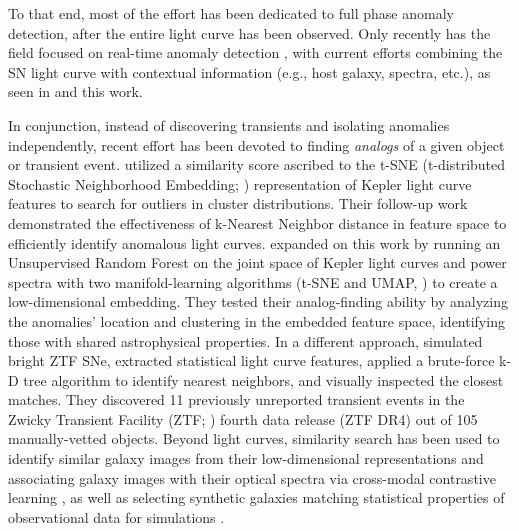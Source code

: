 \documentclass[twocolumn]{aastex63}
\begin{document}
To that end, most of the effort has been dedicated to full phase anomaly detection, after the entire light curve has been observed. Only recently has the field focused on real-time anomaly detection \citep{Soraisam2020, Villar2021, Muthukrishna2022, Perez-Carrasco2023, Gupta2024}, with current efforts combining the SN light curve with contextual information (e.g., host galaxy, spectra, etc.), as seen in \cite{Perez-Carrasco2023} and this work. \par

In conjunction, instead of discovering transients and isolating anomalies independently, recent effort has been devoted to finding \emph{analogs} of a given object or transient event. \cite{Giles2019} utilized a similarity score ascribed to the t-SNE (t-distributed Stochastic Neighborhood Embedding; \citealt{vanderMaaten2008}) representation of Kepler light curve features to search for outliers in cluster distributions. Their follow-up work \citep{Giles2020} demonstrated the effectiveness of k-Nearest Neighbor distance in feature space to efficiently identify anomalous light curves. \cite{Galarza2021} expanded on this work by running an Unsupervised Random Forest \citep{Shi2006} on the joint space of Kepler light curves and power spectra with two manifold-learning algorithms (t-SNE and UMAP, \citealt{McInnes2018}) to create a low-dimensional embedding. They tested their analog-finding ability by analyzing the anomalies' location and clustering in the embedded feature space, identifying those with shared astrophysical properties. In a different approach, \cite{Aleo2022} simulated bright ZTF SNe, extracted statistical light curve features, applied a brute-force k-D tree algorithm to identify nearest neighbors, and visually inspected the closest matches. They discovered 11 previously unreported transient events in the Zwicky Transient Facility (ZTF; \citealt{Bellm2019}) fourth data release (ZTF DR4) out of 105 manually-vetted objects. Beyond light curves, similarity search has been used to identify similar galaxy images from their low-dimensional representations \citep{Stein2021} and associating galaxy images with their optical spectra via cross-modal contrastive learning \citep{Lanusse2023}, as well as selecting synthetic galaxies matching statistical properties of observational data for simulations \citep{Lokken2023}. \par
\end{document}
